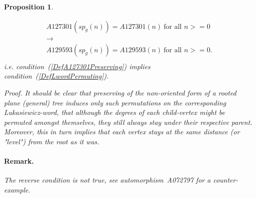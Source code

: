 \documentclass[11pt]{article} %
\newtheorem{propo}{Proposition}
\newcommand{\eqn}[1]{(\ref{#1})}
\newcommand{\eeq}{\end{equation}}
\newcommand{\beql}[1]{\begin{equation}\label{#1}}
\newcommand{\autname}[1]{{\it *#1}}
\newcommand{\automorphism}[1]{automorphism~\autname{#1}}
\newcommand{\ra}{\ensuremath{\rightarrow}\xspace}
\begin{document}
\begin{propo}~\label{PropoPreservingA127301impliesLwordpermuting}
\normalfont

\beql{PreservingA127301impliesLwordpermuting}
\begin{array}{c}
A127301(sp_{g}(n)) = A127301(n)~\mbox{for all $n>=0$} \\
 \ra \\
A129593(sp_{g}(n)) = A129593(n)~\mbox{for all $n>=0$.} \\
\end{array}
\eeq
i.e. condition~\eqn{DefA127301Preserving} implies condition~\eqn{DefLwordPermuting}.

\textit{Proof}. It should be clear that preserving of the non-oriented form
of a rooted plane (general) tree induces only such permutations
on the corresponding Lukasiewicz-word, that although the degrees of
each child-vertex might be permuted amongst themselves, they still
always stay under their respective parent. Moreover, this in turn
implies that each vertex stays at the same distance (or "level")
from the root as it was.

\paragraph{Remark.}
The reverse condition is not true, see \automorphism{A072797} for 
a counter-example.

\end{propo}
\end{document}
